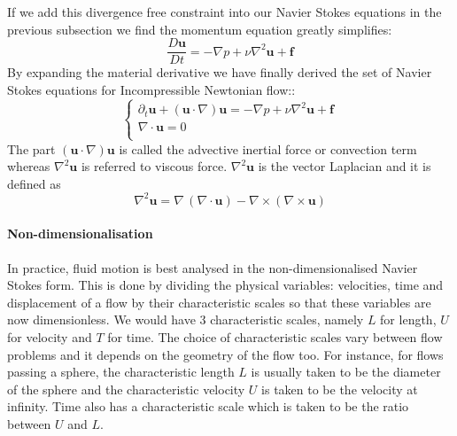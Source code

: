 If we add this divergence free constraint into our Navier Stokes equations in the previous subsection we find the momentum equation greatly simplifies:
\begin{equation}
\dfrac{D\textbf{u}}{Dt} = -\nabla p + \nu \nabla^2\textbf{u} + \textbf{f}
\end{equation}
By expanding the material derivative we have finally derived the set of Navier Stokes equations for Incompressible Newtonian flow::
\begin{equation}
\begin{cases}
\partial_t\textbf{u} + (\textbf{u} \cdot \nabla)\textbf{u} = -\nabla p + \nu \nabla^2\textbf{u} + \textbf{f}\\
\nabla \cdot \textbf{u}=0\\
\end{cases}
\end{equation}
The part $(\textbf{u} \cdot \nabla)\textbf{u}$ is called the advective inertial force or convection term whereas $\nabla^2\textbf{u}$ is referred to viscous force. $\nabla^2 \textbf{u}$ is the vector Laplacian and it is defined as
\begin{equation*}
\nabla^2 \textbf{u} = \nabla \,(\nabla \cdot \textbf{u}) - \nabla \times (\nabla \times \textbf{u})
\end{equation*}

\paragraph*{Non-dimensionalisation}
In practice, fluid motion is best analysed in the non-dimensionalised Navier Stokes form. This is done by dividing the physical variables: velocities, time and displacement of a flow by their characteristic scales so that these variables are now dimensionless. We would have 3 characteristic scales, namely $L$ for length, $U$ for velocity and $T$ for time. The choice of characteristic scales vary between flow problems and it depends on the geometry of the flow too. For instance, for flows passing a sphere, the characteristic length $L$ is usually taken to be the diameter of the sphere and the characteristic velocity $U$ is taken to be the velocity at infinity. Time also has a characteristic scale which is taken to be the ratio between $U$ and $L$. \cite{chorin1990mathematical}\\

